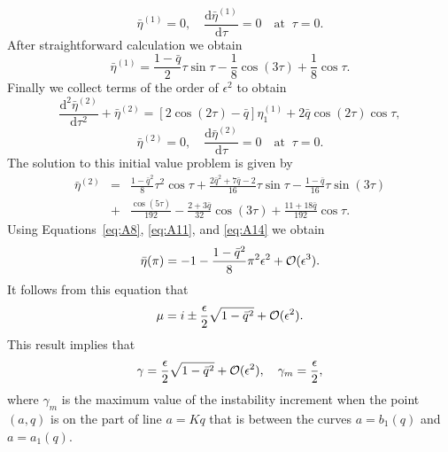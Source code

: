 % 
\begin{equation}
\bar\eta^{(1)} = 0, \quad \frac{\mathrm{d}\bar\eta^{(1)}}{\mathrm{d}\tau} = 0 
   \quad \mbox{at} \;\; \tau = 0.
\label{eq:A10}
\end{equation}
%
After straightforward calculation we obtain
% 
\begin{equation}
\bar\eta^{(1)} = \frac{1 - \bar q}2\tau\sin\tau - \frac18\cos(3\tau) + \frac18\cos\tau.
\label{eq:A11}
\end{equation}
%
Finally we collect terms of the order of $\epsilon^2$ to obtain
%
\begin{equation}
\frac{\mathrm{d}^2\bar\eta^{(2)}}{\mathrm{d}\tau^2} + \bar\eta^{(2)} = 
   [2\cos(2\tau) - \bar q]\eta_1^{(1)} + 2\bar q\cos(2\tau)\cos\tau,
\label{eq:A12} 
\end{equation}
% 
\begin{equation}
\bar\eta^{(2)} = 0, \quad \frac{\mathrm{d}\bar\eta^{(2)}}{\mathrm{d}\tau} = 0 
   \quad \mbox{at} \;\; \tau = 0.
\label{eq:A13}
\end{equation}
%
The solution to this initial value problem is given by
% 
\begin{eqnarray}
\bar\eta^{(2)} &=& \frac{1 - \bar q^2}8\tau^2\cos\tau + 
   \frac{2\bar q^2 + 7\bar q -2}{16}\tau\sin\tau - 
   \frac{1 - \bar q}{16}\tau\sin(3\tau) \nonumber\\ 
&+& \frac{\cos(5\tau)}{192} - \frac{2 + 3\bar q}{32}\cos(3\tau) + 
   \frac{11 + 18\bar q}{192}\cos\tau.
\label{eq:A14}
\end{eqnarray}
%
Using Equations~\eqref{eq:A8}, \eqref{eq:A11}, and \eqref{eq:A14} we obtain
% 
\begin{equation}
\bar\eta(\pi) = -1 - \frac{1 - \bar q^2}8\pi^2\epsilon^2 + {\cal O}(\epsilon^3).
\label{eq:A15}
\end{equation}
%
It follows from this equation that 
% 
\begin{equation}
\mu = i \pm \frac\epsilon2\sqrt{1 - \bar q^2} + {\cal O}(\epsilon^2).
\label{eq:A16}
\end{equation}
%
This result implies that
% 
\begin{equation}
\gamma = \frac\epsilon2\sqrt{1 - \bar q^2} + {\cal O}(\epsilon^2), \quad
   \gamma_m = \frac\epsilon2 ,
\label{eq:A17}
\end{equation}
%
where $\gamma_m$ is the maximum value of the instability increment when the point $(a,q)$ is on the part of line $a = Kq$ that is between the curves $a = b_1(q)$ and $a = a_1(q)$.

